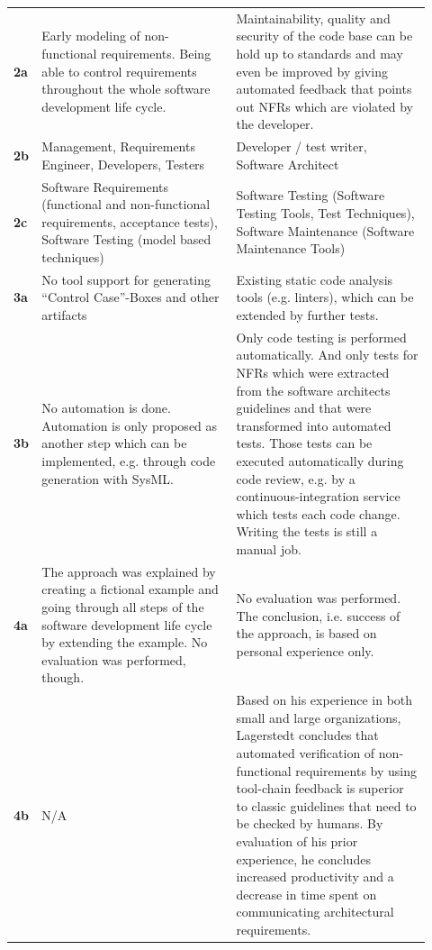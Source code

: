 \begin{longtable}[h]{p{0.02\linewidth}p{0.45\linewidth}p{0.45\linewidth}}
	\textbf{2a} & 
	
	Early modeling of non-functional requirements. Being able to control requirements throughout the whole software development life cycle.
	
	&
	Maintainability, quality and security of the code base can be hold up to standards and may even be improved by giving automated feedback that points out \glspl{NFR} which are violated by the developer.
	
	\\
	
	\textbf{2b} & 
	Management, Requirements Engineer, Developers, Testers
	&
	Developer / test writer, Software Architect
	\\
	
	\textbf{2c} &
	Software Requirements (functional and non-functional requirements, acceptance tests), Software Testing (model based techniques)
	&
	Software Testing (Software Testing Tools, Test Techniques), Software Maintenance (Software Maintenance Tools) \\
	
	\textbf{3a} & 
	No tool support for generating \enquote{Control Case}-Boxes and other artifacts &
	Existing static code analysis tools (e.g. linters), which can be extended by further tests.
	\\
	\textbf{3b} & 
	No automation is done. Automation is only proposed as another step which can be implemented, e.g. through code generation with SysML.
	&
	Only code testing is performed automatically.
	And only tests for \glspl{NFR} which were extracted from the software architects guidelines and that were transformed into automated tests.
	Those tests can be executed automatically during code review, e.g. by a continuous-integration service which tests each code change. Writing the tests is still a manual job.
	\\
	
	\textbf{4a} 	
	&
	The approach was explained by creating a fictional example and going through all steps of the software development life cycle by extending the example. No evaluation was performed, though.
	
	&
	No evaluation was performed. The conclusion, i.e. success of the approach, is based on personal experience only.
	\\
	
	\textbf{4b} &
	N/A &
	
	Based on his experience in both small and large organizations, Lagerstedt concludes that automated verification of non-functional requirements by using tool-chain feedback is superior to classic guidelines that need to be checked by humans. By evaluation of his prior experience, he concludes increased productivity and a decrease in time spent on communicating architectural requirements. \\
\end{longtable}


